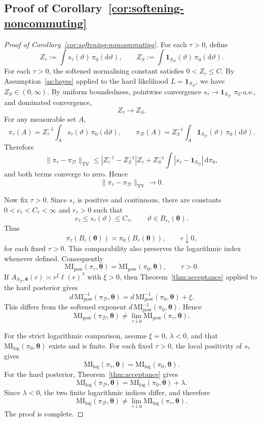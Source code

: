 \documentclass[11pt,a4paper]{article}
\newcommand{\MI}{\mathrm{MI}}
\newcommand{\pa}{\boldsymbol\theta}
\theoremstyle{compactplain}
\theoremstyle{compactdefinition}
\numberwithin{equation}{section}
\begin{document}
\subsection*{Proof of Corollary~\ref{cor:softening-noncommuting}}
\begin{proof}[Proof of Corollary~\ref{cor:softening-noncommuting}]
For each \(\tau>0\), define
\[
 Z_\tau:=\int s_\tau(\vartheta)\,\pi_0(\mathrm d\vartheta),
 \qquad
 Z_S:=\int \mathbf 1_{S_{\mathcal D}}(\vartheta)\,
 \pi_0(\mathrm d\vartheta).
\]
For each \(\tau>0\), the softened normalising constant satisfies
\(0<Z_\tau\le C\). By Assumption~\ref{as:bayes} applied to the hard likelihood
\(L=\mathbf 1_{S_{\mathcal D}}\), we have \(Z_S\in(0,\infty)\). By uniform boundedness,
pointwise convergence \(s_\tau\to\mathbf 1_{S_{\mathcal D}}\) \(\pi_0\)-a.e., and dominated
convergence,
\[
 Z_\tau\to Z_S .
\]
For any measurable set \(A\),
\[
 \pi_\tau(A)=Z_\tau^{-1}\int_A s_\tau(\vartheta)\,\pi_0(\mathrm d\vartheta),
 \qquad
 \pi_{\mathcal D}(A)=Z_S^{-1}\int_A
 \mathbf 1_{S_{\mathcal D}}(\vartheta)\,\pi_0(\mathrm d\vartheta).
\]
Therefore
\[
 \|\pi_\tau-\pi_{\mathcal D}\|_{\mathrm{TV}}
 \le
 |Z_\tau^{-1}-Z_S^{-1}|Z_\tau
 +Z_S^{-1}\int |s_\tau-\mathbf 1_{S_{\mathcal D}}|\,\mathrm d\pi_0,
\]
and both terms converge to zero. Hence
\[
 \|\pi_\tau-\pi_{\mathcal D}\|_{\mathrm{TV}}\to0 .
\]

Now fix \(\tau>0\). Since \(s_\tau\) is positive and continuous, there are constants
\(0<c_\tau<C_\tau<\infty\) and \(r_\tau>0\) such that
\[
 c_\tau\le s_\tau(\vartheta)\le C_\tau,
 \qquad \vartheta\in B_{r_\tau}(\pa).
\]
Thus
\[
 \pi_\tau(B_r(\pa))\asymp\pi_0(B_r(\pa)),
 \qquad r\downarrow0,
\]
for each fixed \(\tau>0\). This comparability also preserves the logarithmic index whenever defined. Consequently
\[
 \MI_{\mathrm{pow}}(\pi_\tau,\pa)
 =\MI_{\mathrm{pow}}(\pi_0,\pa),
 \qquad \tau>0 .
\]
If \(A_{S_{\mathcal D},\pa}(r)\asymp r^\xi\ell(r)^\lambda\) with \(\xi>0\), then
Theorem~\ref{thm:acceptance} applied to the hard posterior gives
\[
 d\,\MI_{\mathrm{pow}}^{-1}(\pi_{\mathcal D},\pa)
 =d\,\MI_{\mathrm{pow}}^{-1}(\pi_0,\pa)+\xi .
\]
This differs from the softened exponent
\(d\,\MI_{\mathrm{pow}}^{-1}(\pi_0,\pa)\). Hence
\[
 \MI_{\mathrm{pow}}(\pi_{\mathcal D},\pa)
 \neq
 \lim_{\tau\downarrow0}\MI_{\mathrm{pow}}(\pi_\tau,\pa).
\]

For the strict logarithmic comparison, assume \(\xi=0\), \(\lambda<0\), and that
\(\MI_{\mathrm{log}}(\pi_0,\pa)\) exists and is finite. For each fixed \(\tau>0\), the local
positivity of \(s_\tau\) gives
\[
 \MI_{\mathrm{log}}(\pi_\tau,\pa)
 =\MI_{\mathrm{log}}(\pi_0,\pa).
\]
For the hard posterior, Theorem~\ref{thm:acceptance} gives
\[
 \MI_{\mathrm{log}}(\pi_{\mathcal D},\pa)
 =\MI_{\mathrm{log}}(\pi_0,\pa)+\lambda .
\]
Since \(\lambda<0\), the two finite logarithmic indices differ, and therefore
\[
 \MI_{\mathrm{log}}(\pi_{\mathcal D},\pa)
 \neq
 \lim_{\tau\downarrow0}\MI_{\mathrm{log}}(\pi_\tau,\pa).
\]
The proof is complete.
\end{proof}
\end{document}
